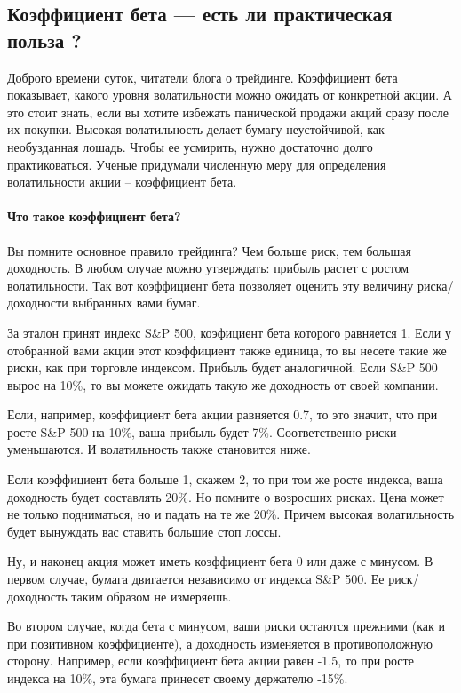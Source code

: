 \documentclass[a5paper]{article}
\begin{document}
\subsection{Коэффициент бета — есть ли практическая польза ?}

Доброго времени суток, читатели блога о трейдинге. Коэффициент бета
показывает, какого уровня волатильности можно ожидать от конкретной
акции. А это стоит знать, если вы хотите избежать панической продажи
акций сразу после их покупки. Высокая волатильность делает бумагу
неустойчивой, как необузданная лошадь. Чтобы ее усмирить, нужно
достаточно долго практиковаться. Ученые придумали численную меру для
определения волатильности акции – коэффициент бета.

\paragraph{Что такое коэффициент бета?}

Вы помните основное правило трейдинга? Чем больше риск, тем большая доходность. В любом случае можно утверждать: прибыль растет с ростом волатильности. Так вот коэффициент бета позволяет оценить эту величину риска/доходности выбранных вами бумаг.

За эталон принят индекс S\&P 500, коэфициент бета которого равняется 1. Если у отобранной вами акции этот коэффициент также единица, то вы несете такие же риски, как при торговле индексом. Прибыль будет аналогичной. Если S\&P 500 вырос на 10\%, то вы можете ожидать такую же доходность от своей компании.

Если, например, коэффициент бета акции равняется 0.7, то это значит, что при росте S\&P 500 на 10\%, ваша прибыль будет 7\%. Соответственно риски уменьшаются. И волатильность также становится ниже.

Если коэффициент бета больше 1, скажем 2, то при том же росте индекса, ваша доходность будет составлять 20\%. Но помните о возросших рисках. Цена может не только подниматься, но и падать на те же 20\%. Причем высокая волатильность будет вынуждать вас ставить большие стоп лоссы.

Ну, и наконец акция может иметь коэффициент бета 0 или даже с минусом. В первом случае, бумага двигается независимо от индекса S\&P 500. Ее риск/доходность таким образом не измеряешь.

Во втором случае, когда бета с минусом, ваши риски остаются прежними (как и при позитивном коэффициенте), а доходность изменяется в противоположную сторону. Например, если коэффициент бета акции равен -1.5, то при росте индекса на 10\%, эта бумага принесет своему держателю -15\%.
\end{document}
